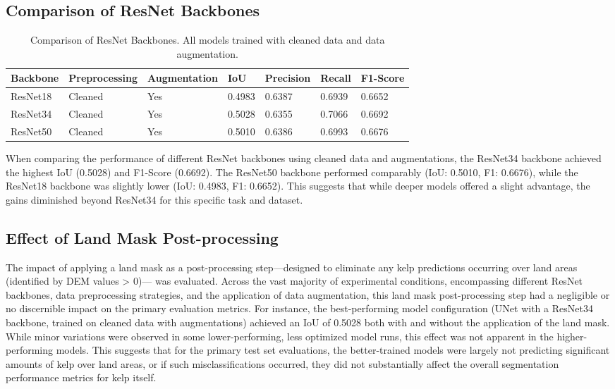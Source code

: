\documentclass{article}
\begin{document}
\newpage

\subsection{Comparison of ResNet Backbones} %

\begin{table}[htbp] %
  \caption{Comparison of ResNet Backbones. All models trained with cleaned data and data augmentation.}
  \label{table:backbone_comparison}
  \centering
  \begin{tabular}{lllllll}
    \toprule
    Backbone & Preprocessing & Augmentation & IoU    & Precision & Recall & F1-Score \\
    \midrule
    ResNet18 & Cleaned       & Yes          & 0.4983 & 0.6387    & 0.6939 & 0.6652   \\
    ResNet34 & Cleaned       & Yes          & 0.5028 & 0.6355    & 0.7066 & 0.6692   \\
    ResNet50 & Cleaned       & Yes          & 0.5010 & 0.6386    & 0.6993 & 0.6676   \\
    \bottomrule
  \end{tabular}
\end{table}

When comparing the performance of different ResNet backbones using cleaned data and augmentations, the ResNet34 backbone achieved the highest IoU (0.5028) and F1-Score (0.6692). The ResNet50 backbone performed comparably (IoU: 0.5010, F1: 0.6676), while the ResNet18 backbone was slightly lower (IoU: 0.4983, F1: 0.6652). This suggests that while deeper models offered a slight advantage, the gains diminished beyond ResNet34 for this specific task and dataset.

\subsection{Effect of Land Mask Post-processing} %

The impact of applying a land mask as a post-processing step—designed to eliminate any kelp predictions occurring over land areas (identified by DEM values > 0)— was evaluated. Across the vast majority of experimental conditions, encompassing different ResNet backbones, data preprocessing strategies, and the application of data augmentation, this land mask post-processing step had a negligible or no discernible impact on the primary evaluation metrics. For instance, the best-performing model configuration (UNet with a ResNet34 backbone, trained on cleaned data with augmentations) achieved an IoU of 0.5028 both with and without the application of the land mask. While minor variations were observed in some lower-performing, less optimized model runs, this effect was not apparent in the higher-performing models. This suggests that for the primary test set evaluations, the better-trained models were largely not predicting significant amounts of kelp over land areas, or if such misclassifications occurred, they did not substantially affect the overall segmentation performance metrics for kelp itself.
\end{document}
